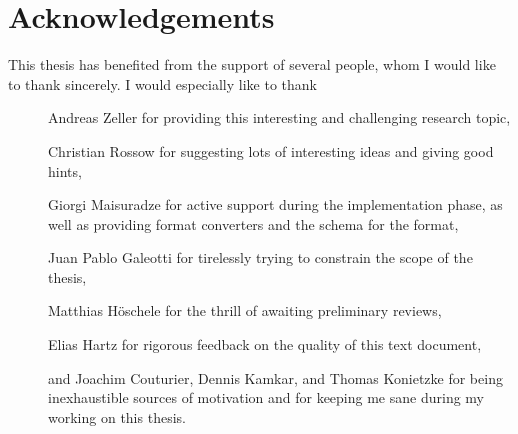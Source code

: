 \section*{Acknowledgements}
This thesis has benefited from the support of several people, whom I would like to thank sincerely.
I would especially like to thank
\begin{description}
	\item[] Andreas Zeller for providing this interesting and challenging research topic,
	\item[] Christian Rossow for suggesting lots of interesting ideas and giving good hints,
	\item[] Giorgi Maisuradze for active support during the implementation phase, as well as providing format
	converters and the schema for the \png format,
	\item[] Juan Pablo Galeotti for tirelessly trying to constrain the scope of the thesis,
 	\item[] Matthias Höschele for the thrill of awaiting preliminary reviews,
 	\item[] Elias Hartz for rigorous feedback on the quality of this text document,
	\item[] and Joachim Couturier, Dennis Kamkar, and Thomas Konietzke for being inexhaustible sources
	of motivation and for keeping me sane during my working on this thesis.
\end{description}